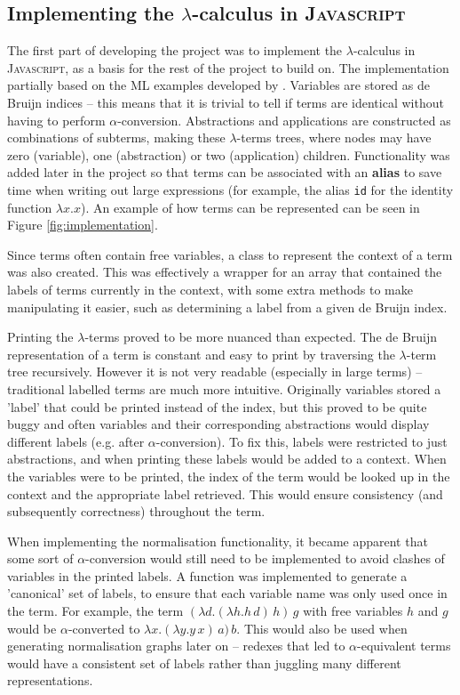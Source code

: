 \documentclass[11pt]{article}
\begin{document}
\subsection{Implementing the \texorpdfstring{$\lambda$}{lambda}-calculus in \textsc{Javascript}}
\label{sec:implementation-lambda}
The first part of developing the project was to implement the $\lambda$-calculus in \textsc{Javascript}, as a basis for the rest of the project to build on. The implementation partially based on the \textsc{ML} examples developed by \cite{pierce}. Variables are stored as de Bruijn indices -- this means that it is trivial to tell if terms are identical without having to perform $\alpha$-conversion. Abstractions and applications are constructed as combinations of subterms, making these $\lambda$-terms trees, where nodes may have zero (variable), one (abstraction) or two (application) children. Functionality was added later in the project so that terms can be associated with an \textbf{alias} to save time when writing out large expressions (for example, the alias \texttt{id} for the identity function $\lambda x. x$). An example of how terms can be represented can be seen in Figure \ref{fig:implementation}.

Since terms often contain free variables, a class to represent the context of a term was also created. This was effectively a wrapper for an array that contained the labels of terms currently in the context, with some extra methods to make manipulating it easier, such as determining a label from a given de Bruijn index. 

Printing the $\lambda$-terms proved to be more nuanced than expected. The de Bruijn representation of a term is constant and easy to print by traversing the $\lambda$-term tree recursively. However it is not very readable (especially in large terms) -- traditional labelled terms are much more intuitive. Originally variables stored a 'label' that could be printed instead of the index, but this proved to be quite buggy and often variables and their corresponding abstractions would display different labels (e.g. after $\alpha$-conversion). To fix this, labels were restricted to just abstractions, and when printing these labels would be added to a context. When the variables were to be printed, the index of the term would be looked up in the context and the appropriate label retrieved. This would ensure consistency (and subsequently correctness) throughout the term. 

When implementing the normalisation functionality, it became apparent that some sort of $\alpha$-conversion would still need to be implemented to avoid clashes of variables in the printed labels. A function was implemented to generate a 'canonical' set of labels, to ensure that each variable name was only used once in the term. For example, the term $(\lambda d. (\lambda h. h \, d) \, h) \, g$ with free variables $h$ and $g$ would be $\alpha$-converted to $\lambda x. (\lambda y. y \, x) \, a) \, b$. This would also be used when generating normalisation graphs later on -- redexes that led to $\alpha$-equivalent terms would have a consistent set of labels rather than juggling many different representations.
\end{document}
